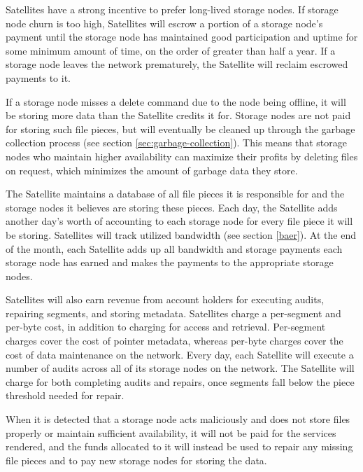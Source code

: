 \documentclass[8pt,fleqn,openany]{book}
\begin{document}
Satellites have a strong incentive to prefer long-lived storage nodes. If
storage node churn is too high, Satellites will escrow a portion of a storage
node's payment until the storage node has maintained good participation and
uptime for some minimum amount of time, on the order of greater than half a year.
If a storage node leaves the network prematurely, the Satellite will reclaim
escrowed payments to it.


If a storage node misses a delete command due to the node being
offline, it will be storing more data than the Satellite credits it for.
Storage nodes are not paid for storing such file pieces, but
will eventually be cleaned up through the garbage collection process
(see section \ref{sec:garbage-collection}).
This means that storage nodes who maintain higher availability
can maximize their profits by deleting files on request,
which minimizes the amount
of garbage data they store.

The Satellite maintains a database of all file pieces it is responsible for
and the storage nodes it believes are storing these pieces. Each day,
the Satellite adds another day's worth
of accounting to each storage node for every file
piece
it will be storing.
Satellites will track utilized bandwidth (see section \ref{baer}).
At the end of the month, each Satellite
adds up all bandwidth and storage payments each storage node has earned and
makes
the payments to the appropriate storage nodes.

Satellites will also earn revenue from account holders for executing audits,
repairing segments, and storing metadata. Satellites charge a per-segment and
per-byte cost, in addition to charging for access and retrieval. Per-segment
charges cover the cost of pointer metadata, whereas per-byte charges cover the
cost of data maintenance on the network.
Every day, each Satellite will execute
a number of audits across all of its storage nodes on the network.
The Satellite will charge for both completing audits
and repairs,
once segments fall below the piece threshold needed for repair.

When it is detected that a storage node acts
maliciously and does not store files properly or maintain sufficient
availability, it will not be paid for the services rendered, and the funds
allocated to it will instead be used to repair any missing
file pieces and to pay new storage nodes for storing the data.
\end{document}
